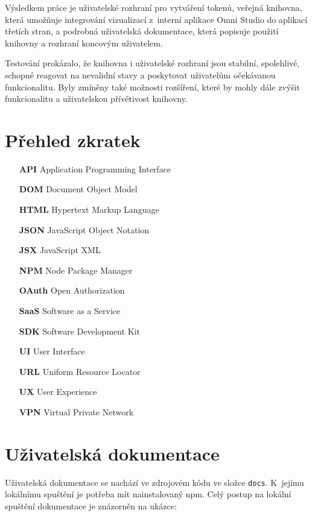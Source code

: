 \documentclass[czech, bc, kiv, he, iso690numb]{fasthesis}
\begin{document}
Výsledkem práce je uživatelské rozhraní pro vytváření tokenů, veřejná knihovna, která umožňuje integrování vizualizací z~interní aplikace Omni Studio
do aplikací třetích stran, a podrobná uživatelská dokumentace, která popisuje použití knihovny a rozhraní koncovým uživatelem.

Testování prokázalo, že knihovna i uživatelské rozhraní jsou stabilní, spolehlivé, schopné reagovat na nevalidní stavy a poskytovat uživatelům očekávanou funkcionalitu. Byly zmíněny 
také možnosti rozšíření, které by mohly dále zvýšit funkcionalitu a uživatelskou přívětivost knihovny.

\chapter*{Přehled zkratek}

\begin{itemize}[align=left, labelwidth=1.5cm, labelsep=10pt, leftmargin=!]
    \item[\textbf{API}]    Application Programming Interface  
    \item[\textbf{DOM}] 	Document Object Model
    \item[\textbf{HTML}]  Hypertext Markup Language
    \item[\textbf{JSON}]  JavaScript Object Notation
    \item[\textbf{JSX}] JavaScript XML
    \item[\textbf{NPM}] Node Package Manager
    \item[\textbf{OAuth}] Open Authorization
    \item[\textbf{SaaS}]  Software as a Service
    \item[\textbf{SDK}]    Software Development Kit
    \item[\textbf{UI}]        User Interface
    \item[\textbf{URL}] Uniform Resource Locator
    \item[\textbf{UX}]        User Experience
    \item[\textbf{VPN}]        Virtual Private Network
\end{itemize}

\appendix
\chapter{Uživatelská dokumentace}\label{app:docuDocs}
Uživatelská dokumentace se nachází ve zdrojovém kódu ve složce \texttt{docs}. K~jejímu lokálnímu spuštění je potřeba mít nainstalovaný npm.
Celý postup na lokální spuštění dokumentace je znázorněn na ukázce:
\end{document}
